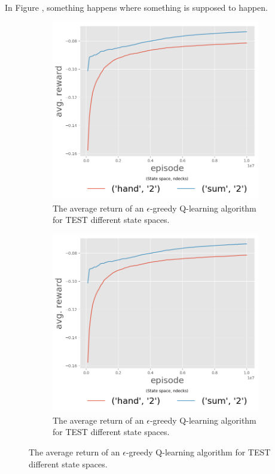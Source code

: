 In Figure \label{fig:avg_return_sums}, something happens where something is supposed to happen. 

\begin{figure}[htp]
\centering
 \begin{subfigure}[b]{0.3\textwidth}
  	 \includegraphics[width=\textwidth]{./figures/avgReturnEp_ndeck2.png}
   \caption{The average return of an $\epsilon$-greedy Q-learning algorithm for TEST different state spaces. \label{fig:avg_return_sums}}
 \end{subfigure}
 \hspace{0.2cm}
 \begin{subfigure}[b]{0.3\textwidth}
  	 \includegraphics[width=\textwidth]{./figures/avgReturnEp_ndeck2.png}
   \caption{The average return of an $\epsilon$-greedy Q-learning algorithm for TEST different state spaces. \label{fig:avg_return_sums}}
 \end{subfigure}
\end{figure}